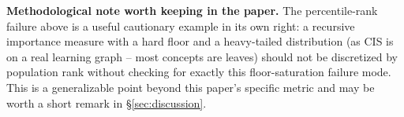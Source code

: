 
\textbf{Methodological note worth keeping in the paper.} The percentile-rank
failure above is a useful cautionary example in its own right: a recursive
importance measure with a hard floor and a heavy-tailed distribution (as CIS
is on a real learning graph -- most concepts are leaves) should not be
discretized by population rank without checking for exactly this
floor-saturation failure mode. This is a generalizable point beyond this
paper's specific metric and may be worth a short remark in
\S\ref{sec:discussion}.
